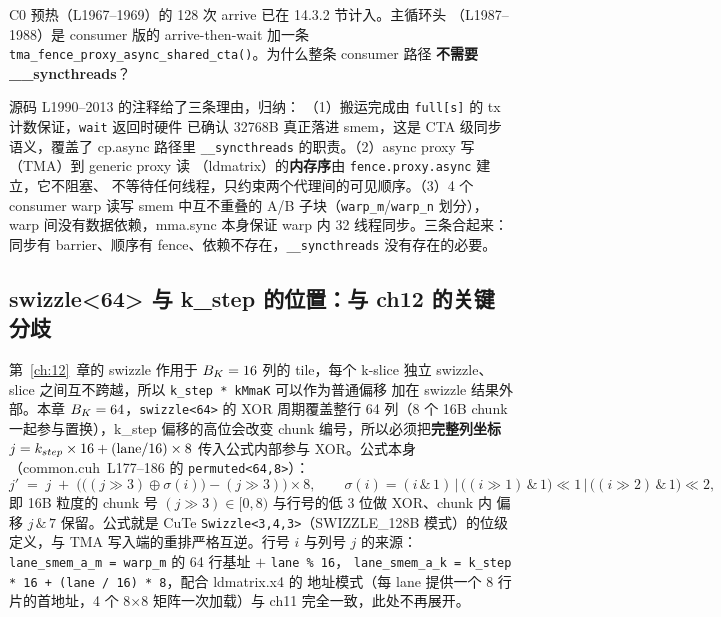 

C0 预热（L1967--1969）的 128 次 arrive 已在 14.3.2 节计入。主循环头
（L1987--1988）是 consumer 版的 arrive-then-wait 加一条
\texttt{tma\_\allowbreak{}fence\_\allowbreak{}proxy\_\allowbreak{}async\_\allowbreak{}shared\_\allowbreak{}cta\allowbreak{}()}。为什么整条 consumer 路径
\textbf{不需要 \_\_syncthreads}？

源码 L1990--2013 的注释给了三条理由，归纳：
（1）搬运完成由 \texttt{full[s]} 的 tx 计数保证，\texttt{wait} 返回时硬件
已确认 32768B 真正落进 smem，这是 CTA 级同步语义，覆盖了 cp.async 路径里
\texttt{\_\allowbreak{}\_\allowbreak{}syncthreads} 的职责。（2）async proxy 写（TMA）到 generic proxy 读
（ldmatrix）的\textbf{内存序}由 \texttt{fence.\allowbreak{}proxy.\allowbreak{}async} 建立，它不阻塞、
不等待任何线程，只约束两个代理间的可见顺序。（3）4 个 consumer warp 读写
smem 中互不重叠的 A/B 子块（\texttt{warp\_m}/\texttt{warp\_n} 划分），
warp 间没有数据依赖，mma.sync 本身保证 warp 内 32 线程同步。三条合起来：
同步有 barrier、顺序有 fence、依赖不存在，\texttt{\_\allowbreak{}\_\allowbreak{}syncthreads} 没有存在的必要。

\subsection{swizzle<64> 与 k\_step 的位置：与 ch12 的关键分歧}



第~\ref{ch:12}~章的 swizzle 作用于 $B\sb{K} = 16$ 列的 tile，每个 k-slice 独立
swizzle、slice 之间互不跨越，所以 \texttt{k\_step * kMmaK} 可以作为普通偏移
加在 swizzle 结果外部。本章 $B\sb{K} = 64$，\texttt{swizzle<64>} 的 XOR
周期覆盖整行 64 列（8 个 16B chunk 一起参与置换），k\_step 偏移的高位会改变
chunk 编号，所以必须把\textbf{完整列坐标} $j = k\sb{step} \times 16 + (\mathrm{lane}
/ 16) \times 8$ 传入公式内部参与 XOR。公式本身
（common.cuh~L177--186 的 \texttt{permuted\allowbreak{}<64,\allowbreak{}8>}）：
\begin{equation}
  j' \;=\; j \;+\; \Big( \big( (j \gg 3) \oplus \sigma(i) \big) - (j \gg 3)
  \Big) \times 8, \qquad
  \sigma(i) = (i\,\&\,1) \,\vert\, \big((i \gg 1)\,\&\,1\big) \ll 1 \,\vert\,
  \big((i \gg 2)\,\&\,1\big) \ll 2 ,
\end{equation}
即 16B 粒度的 chunk 号 $(j \gg 3) \in [0, 8)$ 与行号的低 3 位做 XOR、chunk 内
偏移 $j \,\&\, 7$ 保留。公式就是 CuTe \texttt{Swizzle\allowbreak{}<3,\allowbreak{}4,\allowbreak{}3>}（SWIZZLE\_128B
模式）的位级定义，与 TMA 写入端的重排严格互逆。行号 $i$ 与列号 $j$ 的来源：
\texttt{lane\_\allowbreak{}smem\_\allowbreak{}a\_\allowbreak{}m =\allowbreak{} warp\_\allowbreak{}m} 的 64 行基址 $+$ \texttt{lane \% 16}，
\texttt{lane\_\allowbreak{}smem\_\allowbreak{}a\_\allowbreak{}k =\allowbreak{} k\_\allowbreak{}step * 16 + \allowbreak{}(lane /\allowbreak{} 16) * 8}，配合 ldmatrix.x4 的
地址模式（每 lane 提供一个 8 行片的首地址，4 个 8$\times$8 矩阵一次加载）与
ch11 完全一致，此处不再展开。

